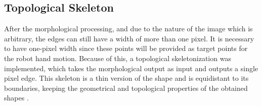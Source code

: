 \documentclass[conference]{IEEEtran}
\begin{document}

\subsection{Topological Skeleton}

After the morphological processing, and due to the nature of the image which is arbitrary, the edges can still have a width of more than one pixel. It is necessary to have one-pixel width since these points will be provided as target points for the robot hand motion. Because of this, a topological skeletonization was implemented, which takes the morphological output as input and outputs a single pixel edge. This skeleton is a thin version of the shape and is equidistant to its boundaries, keeping the geometrical and topological properties of the obtained shapes \cite{maragos1986morphological} \cite{gonzalez2004digital2}.
\end{document}
